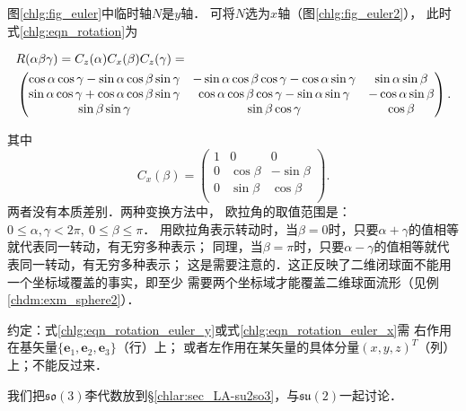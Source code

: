 图\ref{chlg:fig_euler}中临时轴$N$是$y$轴．
可将$N$选为$x$轴（图\ref{chlg:fig_euler2}），
此时式\eqref{chlg:eqn_rotation}为
\begin{small}
    \begin{align}
        &R(\alpha\beta\gamma)=C_z(\alpha)C_{{x}}(\beta)C_z(\gamma) =   \label{chlg:eqn_rotation_euler_x} \\
        &\begin{pmatrix}
            \cos\alpha \cos\gamma-\sin\alpha \cos\beta \sin\gamma  & -\sin\alpha \cos\beta \cos\gamma -\cos\alpha \sin\gamma &  \sin\alpha \sin\beta \\
            \sin\alpha \cos\gamma+\cos\alpha \cos\beta \sin\gamma  &  \cos\alpha \cos\beta \cos\gamma -\sin\alpha \sin\gamma & -\cos\alpha \sin\beta \\
            \sin\beta  \sin\gamma & \sin\beta \cos\gamma  & \cos\beta
        \end{pmatrix} . \notag
    \end{align}
\end{small}
其中
\begin{equation}\label{chlg:eqn_rotation-x}
    {C_x}( \beta  ) = \begin{pmatrix}
        1&0&0 \\
        0&{\cos \beta }&{ - \sin \beta } \\
        0&{\sin \beta }&{\cos \beta } \\
    \end{pmatrix} .
\end{equation}
两者没有本质差别．两种变换方法中，
欧拉角的取值范围是：$0 \leqslant \alpha, \gamma < 2\pi,\ 0\leqslant \beta \leqslant \pi$．
用欧拉角表示转动时，当$\beta=0$时，只要$\alpha+\gamma$的值相等就代表同一转动，有无穷多种表示；
同理，当$\beta=\pi$时，只要$\alpha-\gamma$的值相等就代表同一转动，有无穷多种表示；
这是需要注意的．这正反映了二维闭球面不能用一个坐标域覆盖的事实，即至少
需要两个坐标域才能覆盖二维球面流形（见例\ref{chdm:exm_sphere2}）．


{\heiti 约定}：式\eqref{chlg:eqn_rotation_euler_y}或式\eqref{chlg:eqn_rotation_euler_x}需
右作用在基矢量$\{\boldsymbol{e}_1,\boldsymbol{e}_2,\boldsymbol{e}_3\}$（行）上；
或者左作用在某矢量的具体分量$(x,y,z)^T$（列）上；不能反过来．

我们把$\mathfrak{so}(3)$李代数放到\S\ref{chlar:sec_LA-su2so3}，与$\mathfrak{su}(2)$一起讨论．

  

